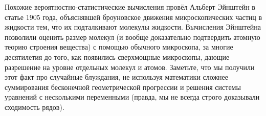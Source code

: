 \documentclass{article}
\begin{document}
Похожие вероятностно-статистические вычисления провёл Альберт Эйнштейн в статье 1905 года, объяснявшей броуновское движения микроскопических частиц в жидкости тем, что их подталкивают молекулы жидкости. 
Вычисления Эйнштейна позволили оценить размер молекул (и вообще доказательно подтвердить атомную теорию строения вещества) с помощью обычного микроскопа, за многие десятилетия до того, как появились сверхмощные микроскопы, дающие разрешение на уровне отдельных молекул и атомов. Заметьте, что мы получили этот факт про случайные блуждания, не используя математики сложнее суммирования бесконечной геометрической прогрессии и решения системы уравнений с несколькими переменными (правда, мы не всегда строго доказывали сходимость рядов).
\end{document}
